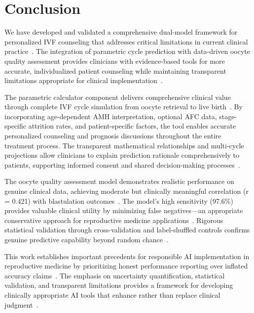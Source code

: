 \section{Conclusion}\label{sec:conclusion}

We have developed and validated a comprehensive dual-model framework for personalized IVF counseling that addresses critical limitations in current clinical practice~\cite{gameiro2023understanding,asrm2017embryo}. The integration of parametric cycle prediction with data-driven oocyte quality assessment provides clinicians with evidence-based tools for more accurate, individualized patient counseling while maintaining transparent limitations appropriate for clinical implementation~\cite{fda2022clinical}.

The parametric calculator component delivers comprehensive clinical value through complete IVF cycle simulation from oocyte retrieval to live birth~\cite{lee2017amh,song2021amh}. By incorporating age-dependent AMH interpretation, optional AFC data, stage-specific attrition rates, and patient-specific factors, the tool enables accurate personalized counseling and prognosis discussions throughout the entire treatment process. The transparent mathematical relationships and multi-cycle projections allow clinicians to explain prediction rationale comprehensively to patients, supporting informed consent and shared decision-making processes~\cite{beauchamp2019principles,asrm2021counselors}.

The oocyte quality assessment model demonstrates realistic performance on genuine clinical data, achieving moderate but clinically meaningful correlation (r = 0.421) with blastulation outcomes~\cite{varoquaux2022machine}. The model's high sensitivity (97.6\%) provides valuable clinical utility by minimizing false negatives—an appropriate conservative approach for reproductive medicine applications~\cite{cutting2008elective}. Rigorous statistical validation through cross-validation and label-shuffled controls confirms genuine predictive capability beyond random chance~\cite{cohen1988statistical,mann1947test}.

This work establishes important precedents for responsible AI implementation in reproductive medicine by prioritizing honest performance reporting over inflated accuracy claims~\cite{rudin2019stop,topol2019high}. The emphasis on uncertainty quantification, statistical validation, and transparent limitations provides a framework for developing clinically appropriate AI tools that enhance rather than replace clinical judgment~\cite{rajkomar2019machine}.

